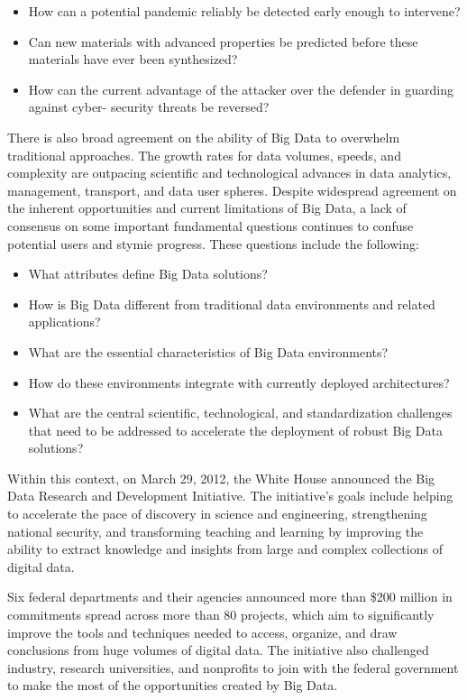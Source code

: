 \documentclass[11pt]{article}
\begin{document}
\begin{itemize}
\item	How can a potential pandemic reliably be detected early enough to intervene? 
\item	Can new materials with advanced properties be predicted before these materials have ever been 
synthesized? 
\item	How can the current advantage of the attacker over the defender in guarding against cyber-
security threats be reversed? 
\end{itemize}



There is also broad agreement on the ability of Big Data to overwhelm traditional approaches. The growth 
rates for data volumes, speeds, and complexity are outpacing scientific and technological advances in data 
analytics, management, transport, and data user spheres. 
Despite widespread agreement on the inherent opportunities and current limitations of Big Data, a lack of 
consensus on some important fundamental questions continues to confuse potential users and stymie 
progress. These questions include the following: 

\begin{itemize}
\item	What attributes define Big Data solutions? 
\item	How is Big Data different from traditional data environments and related applications? 
\item	What are the essential characteristics of Big Data environments? 
\item	How do these environments integrate with currently deployed architectures? 
\item	What are the central scientific, technological, and
standardization challenges that need to be  addressed to accelerate the deployment of robust Big Data solutions?
\end{itemize}



Within this context, on March 29, 2012, the White House announced the Big Data Research and 
Development Initiative.  The initiative’s goals include helping to accelerate the pace of discovery in 
science and engineering, strengthening national security, and transforming teaching and learning by 
improving the ability to extract knowledge and insights from large and complex collections of digital 
data.

Six federal departments and their agencies announced more than \$200 million in commitments spread 
across more than 80 projects, which aim to significantly improve the tools and techniques needed to 
access, organize, and draw conclusions from huge volumes of digital data. The initiative also challenged 
industry, research universities, and nonprofits to join with the federal government to make the most of the 
opportunities created by Big Data. 
\end{document}

